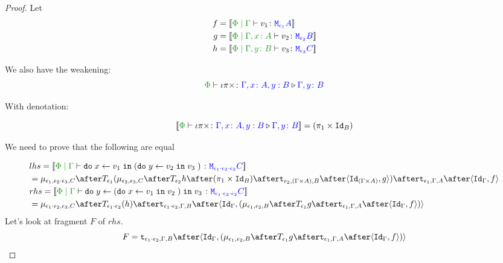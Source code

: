 \documentclass{report}
\begin{document}
\begin{framed}
\begin{proof}
        
        
        \case{\eqassociativity}
        Let
        \begin{align*}
            f ={}& \deno{\gpetyperelation{v_1}{\M{\e_1}{A}}}\\
            g ={}& \deno{\etyperelation{\P}{\gax}{v_2}{\M{\e_2}{B}}}\\
            h ={}& \deno{\etyperelation{\P}{\gby}{v_3}{\M{\e_3}{C}}}\\
        \end{align*}
        
        We also have the weakening:
        \begin{equation}
            \ewrel{\P}{\i\pi\times}{\gax, y: B}{\gby}
        \end{equation}
        
        With denotation:
        
        \begin{equation}
            \deno{\ewrel{\P}{\i\pi\times}{\gax, y: B}{\gby}} = (\p \times \Id{B})
        \end{equation}
        
        We need to prove that the following are equal
        
        \begin{align*}
            &lhs =  \deno{\gpetyperelation{\doin{x}{v_1}{(\doin{y}{v_2}{v_3})}}{\M{\e_1\dot\e_2\dot\e_2}{C}}} \\
            & = \bind{\e_1}{\e_2\dot\e_3}{C}\after\T{
                \e_1}{(\bind{\e_2}{\e_3}{C}\after\T{\e_2}{h\after(\p \times \Id{B})}\after\tstrength{\e_2}{(\G\times A)}{B}\after\pr{\Id{(\G\times A)}}{g}
                )}\after\tstrength{\e_1}{\G}{A}\after\pr{\idg}{f}\\
            & rhs = \deno{\gpetyperelation{\doin{y}{(\doin{x}{v_1}{v_2})}{v_3}}{\M{\e_1\dot\e_2\dot\e_2}{C}}}  \\
            & = \bind{\e_1\dot\e_2}{\e_3}{C}\after\T{\e_1\dot\e_2}{(h)}\after\tstrength{\e_1\dot\e_2}{\G}{B}\after\pr{\idg}{(\bind{\e_1}{\e_2}{B}\after\T{\e_1}{g}\after\tstrength{\e_1}{\G}{A}\after\pr{\idg}{f})} \\
        \end{align*}
        Let's look at fragment $F$ of $rhs$.
        \begin{equation}
            F = \tstrength{\e_1\dot\e_2}{\G}{B}\after\pr{\idg}{(\bind{\e_1}{\e_2}{B}\after\T{\e_1}{g}\after\tstrength{\e_1}{\G}{A}\after\pr{\idg}{f})}
        \end{equation}
        

\end{proof}
\end{framed}
\end{document}
